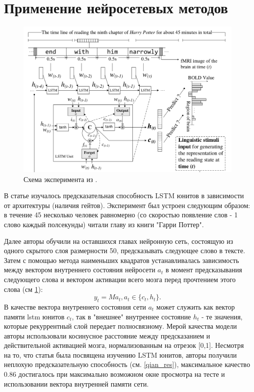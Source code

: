\documentclass[pdftex,ptm,12pt,a4paper]{report}
\theoremstyle{definition}
\begin{document}
\section{Применение нейросетевых методов}

\begin{figure}[h]
\includegraphics[scale=0.3]{images/lstm.png}
\centering
\caption{Схема эксперимента из \cite{qian2016bridging}.}
\label{ch_experiment}
\end{figure}

В статье \cite{qian2016bridging} изучалось предсказательная способность LSTM юнитов в зависимости от архитектуры (наличия гейтов). Эксперимент был устроен следующим образом: в течение 45 несколько человек равномерно (со скоростью появление слов - 1 слово каждый полсекунды) читали главу из книги "Гарри Поттер".

Далее авторы обучили на оставшихся главах нейронную сеть, состоящую из одного скрытого слоя  размерности 50, предсказывать следующее слово в тексте. Затем с помощью метода наименьших квадратов устанавливалась зависимость между вектором внутреннего состояния нейросети $a_t$ в момент предсказывания следующего слова и вектором активации всего мозга перед прочтением этого слова (см \ref{ch_experiment}):
$$ y_t = M a_t, a_t \in \{c_t, h_t\}.$$
В качестве вектора внутреннего состояния сети $a_t$ может служить как вектор памяти lstm юнитов $c_t$, так в "внешнее" внутреннее состояние $h_t$ - те значения, которые рекуррентный слой передает полносвязному.
Мерой качества модели авторы использовали косинусное расстояние между предсказанием и действительной активацией мозга, нормализованным на отрезок [0,1]. Несмотря на то, что статья была посвящена изучению LSTM юнитов, авторы получили неплохую предсказательную способность (см. \ref{qian_res}), максимальное качество 0.86 достигалось при максимально возможном окне просмотра на тесте и использовании вектора внутренней памяти сети.
\end{document}

